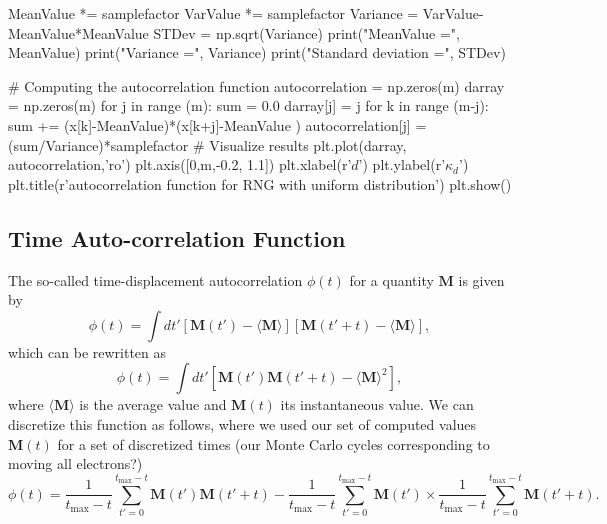 \documentclass[%
oneside,                 %
final,                   %
10pt]{article}
\begin{document}
MeanValue *= samplefactor
VarValue *= samplefactor
Variance = VarValue-MeanValue*MeanValue
STDev = np.sqrt(Variance)
print("MeanValue =", MeanValue)
print("Variance =", Variance)
print("Standard deviation =", STDev)

# Computing the autocorrelation function
autocorrelation = np.zeros(m)
darray = np.zeros(m)
for j in range (m):
    sum = 0.0
    darray[j] = j
    for k in range (m-j):
        sum += (x[k]-MeanValue)*(x[k+j]-MeanValue ) 
    autocorrelation[j] = (sum/Variance)*samplefactor
# Visualize results
plt.plot(darray, autocorrelation,'ro')
plt.axis([0,m,-0.2, 1.1])
plt.xlabel(r'$d$')
plt.ylabel(r'$\kappa_d$')
plt.title(r'autocorrelation function for RNG with uniform distribution')
plt.show()

\epycod


\subsection{Time Auto-correlation Function}
\begin{block}{}
The so-called time-displacement autocorrelation $\phi(t)$ for a quantity $\mathbf{M}$ is given by
\[
\phi(t) = \int dt' \left[\mathbf{M}(t')-\langle \mathbf{M} \rangle\right]\left[\mathbf{M}(t'+t)-\langle \mathbf{M} \rangle\right],
\]
which can be rewritten as 
\[
\phi(t) = \int dt' \left[\mathbf{M}(t')\mathbf{M}(t'+t)-\langle \mathbf{M} \rangle^2\right],
\]
where $\langle \mathbf{M} \rangle$ is the average value and
$\mathbf{M}(t)$ its instantaneous value. We can discretize this function as follows, where we used our
set of computed values $\mathbf{M}(t)$ for a set of discretized times (our Monte Carlo cycles corresponding to moving all electrons?)
\[
\phi(t)  = \frac{1}{t_{\mathrm{max}}-t}\sum_{t'=0}^{t_{\mathrm{max}}-t}\mathbf{M}(t')\mathbf{M}(t'+t)
-\frac{1}{t_{\mathrm{max}}-t}\sum_{t'=0}^{t_{\mathrm{max}}-t}\mathbf{M}(t')\times
\frac{1}{t_{\mathrm{max}}-t}\sum_{t'=0}^{t_{\mathrm{max}}-t}\mathbf{M}(t'+t).
\label{eq:phitf}
\]
\end{block}

\end{document}
